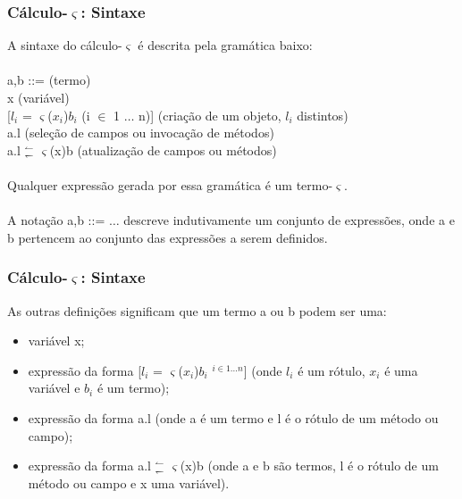 \documentclass[10pt, compress]{beamer}
\begin{document}
\begin{frame}[fragile]
  \frametitle{Cálculo-$\varsigma$: Sintaxe}
  A sintaxe do cálculo-$\varsigma$ é descrita pela gramática baixo:
  \\~\\
  a,b ::= (termo)
  \\
  \hspace{1cm} x  (variável)
  \\
  \hspace{1cm} [$l_{i}$ = $\varsigma$($x_{i}$)$b_{i}$ (i $\in$ 1 $\ldots$ n)]  (criação de um objeto, $l_{i}$ distintos)
  \\
  \hspace{1cm} a.l  (seleção de campos ou invocação de métodos)
  \\
  \hspace{1cm} a.l $^{\leftharpoonup}_{\leftharpoondown}$  $\varsigma$(x)b  (atualização de campos ou métodos)
  \\~\\
  Qualquer expressão gerada por essa gramática é um termo-$\varsigma$.
  \\~\\
  A notação a,b ::= $\ldots$ descreve indutivamente um conjunto de expressões, onde a e b pertencem ao conjunto das expressões a
  serem definidos.
\end{frame}

\begin{frame}[fragile]
  \frametitle{Cálculo-$\varsigma$: Sintaxe}
  As outras definições significam que um termo a ou b podem ser uma:
  \begin{itemize}
  \item variável x;
  \item expressão da forma [$l_{i}$ = $\varsigma$($x_{i}$)$b_{i}$ $^{i \in 1 \ldots n}$] 
    (onde $l_{i}$ é um rótulo, $x_{i}$ é uma variável e $b_{i}$ é um termo);
  \item expressão da forma a.l (onde a é um termo e l é o rótulo de um método ou campo);
  \item expressão da forma a.l $^{\leftharpoonup}_{\leftharpoondown}$  $\varsigma$(x)b 
    (onde a e b são termos, l é o rótulo de um método ou campo e x uma variável).
  \end{itemize}
\end{frame}
\end{document}
